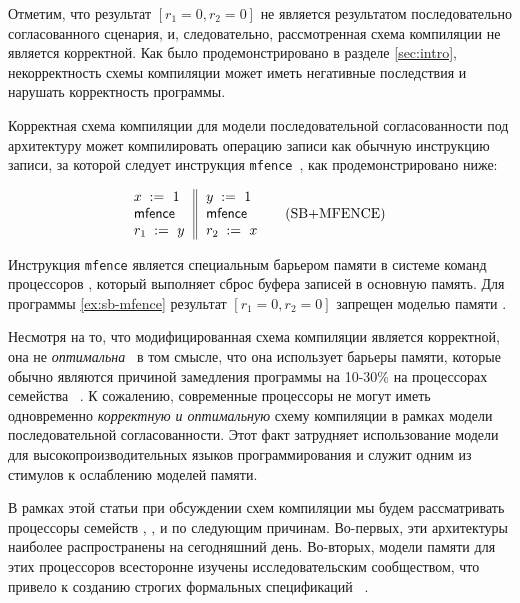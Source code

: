 Отметим, что результат ${[r_1=0, r_2=0]}$ не является результатом последовательно согласованного сценария,
и, следовательно, рассмотренная схема компиляции не является корректной. 
Как было продемонстрировано в разделе \cref{sec:intro}, 
некорректность схемы компиляции может иметь 
негативные последствия и нарушать корректность программы. 

Корректная схема компиляции для модели последовательной согласованности 
под архитектуру \Intel может компилировать 
операцию записи как обычную инструкцию записи, за которой следует 
инструкция \texttt{mfence}~\cite{Sewell-al:CACM10, Batty-al:POPL11}, 
как продемонстрировано ниже:

\begin{equation*}
\inarrII{
   \writeInst{}{x}{1}   \\
   \mfenceInst          \\
   \readInst{}{r_1}{y}  \\
}{
  \writeInst{}{y}{1}   \\
  \mfenceInst          \\
  \readInst{}{r_2}{x}  \\
}
\tag{SB+MFENCE}\label{ex:sb-mfence}
\end{equation*}

Инструкция \texttt{mfence} является специальным барьером памяти в системе команд процессоров 
\Intel, который выполняет сброс буфера записей в основную память. 
Для программы \ref{ex:sb-mfence} результат ${[r_1=0, r_2=0]}$
запрещен моделью памяти \Intel. 

Несмотря на то, что модифицированная схема компиляции является корректной, 
она не \emph{оптимальна}~\cite{OptimalCompilationCPP}
в том смысле, что она использует барьеры памяти,
которые обычно являются причиной замедления программы 
на 10-30\% на процессорах семейства \Intel~\cite{Marino-al:PLDI11, Liu-al:OOPSLA17}.
К сожалению, современные процессоры не могут  иметь одновременно \emph{корректную и оптимальную} 
схему компиляции в рамках модели последовательной согласованности. 
Этот факт затрудняет  использование модели \SC  
для высокопроизводительных языков программирования 
и служит одним из стимулов к ослаблению моделей памяти. 

В рамках этой статьи при обсуждении 
схем компиляции мы будем рассматривать процессоры семейств
\Intel, ,  и \POWER 
по следующим причинам. 
Во-первых, эти архитектуры наиболее 
распространены на сегодняшний день. 
Во-вторых, модели памяти для этих процессоров 
всесторонне изучены  исследовательским сообществом, 
что привело к созданию строгих 
формальных спецификаций~%
\cite{Sewell-al:CACM10, Sarkar-al:PLDI11, 
Flur-al:POPL16, Pulte-al:POPL18}. 

